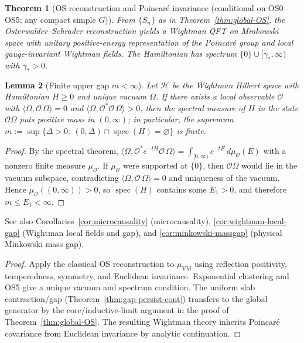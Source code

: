 \documentclass[11pt]{amsart}
\theoremstyle{plain}
\newtheorem{theorem}{Theorem}[section]
\newtheorem{lemma}[theorem]{Lemma}
\theoremstyle{definition}
\theoremstyle{remark}
\begin{document}
\begin{theorem}[OS reconstruction and Poincar\'e invariance (conditional on OS0--OS5; any compact simple $G$)]\label{thm:os-to-wightman-global}
From $\{S_n\}$ as in Theorem~\ref{thm:global-OS}, the Osterwalder--Schrader reconstruction yields a Wightman QFT on Minkowski space with unitary positive-energy representation of the Poincar\'e group and local gauge-invariant Wightman fields. The Hamiltonian has spectrum $\{0\}\cup[\gamma_*,\infty)$ with $\gamma_*>0$.
\end{theorem}
\begin{lemma}[Finite upper gap $m<\infty$]\label{lem:finite-upper-gap}
Let $\mathcal H$ be the Wightman Hilbert space with Hamiltonian $H\ge 0$ and unique vacuum $\Omega$. If there exists a local observable $\mathcal O$ with $\langle \Omega,\mathcal O\,\Omega\rangle=0$ and $\langle \Omega,\mathcal O^*\mathcal O\,\Omega\rangle>0$, then the spectral measure of $H$ in the state $\mathcal O\Omega$ puts positive mass in $(0,\infty)$; in particular, the supremum $m:=\sup\{\Delta>0:\ (0,\Delta)\cap \operatorname{spec}(H)=\varnothing\}$ is finite.
\end{lemma}
\begin{proof}
By the spectral theorem, $\langle \Omega,\mathcal O^* e^{-tH} \mathcal O\,\Omega\rangle=\int_{[0,\infty)}e^{-tE}\,d\mu_{\mathcal O}(E)$ with a nonzero finite measure $\mu_{\mathcal O}$. If $\mu_{\mathcal O}$ were supported at $\{0\}$, then $\mathcal O\Omega$ would lie in the vacuum subspace, contradicting $\langle \Omega,\mathcal O\,\Omega\rangle=0$ and uniqueness of the vacuum. Hence $\mu_{\mathcal O}((0,\infty))>0$, so $\operatorname{spec}(H)$ contains some $E_1>0$, and therefore $m\le E_1<\infty$.
\end{proof}
\noindent See also Corollaries~\ref{cor:microcausality} (microcausality), \ref{cor:wightman-local-gap} (Wightman local fields and gap), and \ref{cor:minkowski-massgap} (physical Minkowski mass gap).
\begin{proof}
Apply the classical OS reconstruction to $\mu_{\mathrm{YM}}$ using reflection positivity, temperedness, symmetry, and Euclidean invariance. Exponential clustering and OS5 give a unique vacuum and spectrum condition. The uniform slab contraction/gap (Theorem~\ref{thm:gap-persist-cont}) transfers to the global generator by the core/inductive-limit argument in the proof of Theorem~\ref{thm:global-OS}. The resulting Wightman theory inherits Poincar\'e covariance from Euclidean invariance by analytic continuation.
\end{proof}
\end{document}
